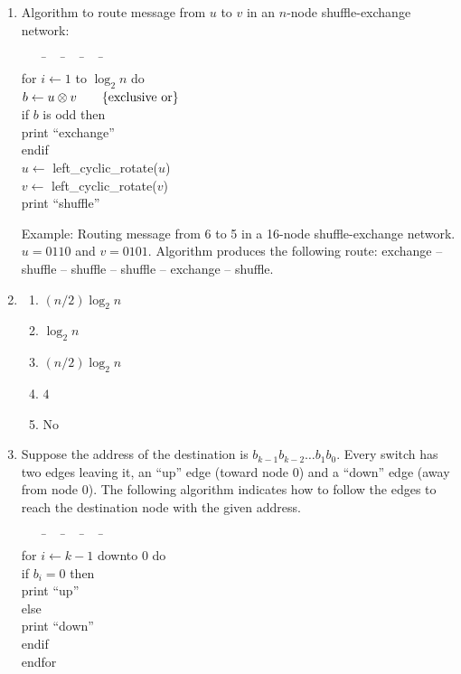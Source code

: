 \begin{enumerate}
       In all other cases, $u$ and $v$ have at least one bit in common,
       and following no more than $k-1$ shuffle links and $k-1$ exchange
       links is sufficient to reach $v$ from $u$.

\item Algorithm to route message from $u$ to $v$ in an $n$-node
      shuffle-exchange network: 

      \begin{tabbing}
      \ \ \ \=\ \ \ \=\ \ \ \=\ \ \ \=\ \ \ \=\\
      for $i \leftarrow 1$ to $\log_2 n$ do\\
      \> $b \leftarrow u \otimes v\quad\quad \{{\rm exclusive\ or}\}$\\
      \> if $b$ is odd then\\
      \>\> print ``exchange''\\
      \> endif\\
      \> $u \leftarrow$ left\_cyclic\_rotate($u$)\\
      \> $v \leftarrow$ left\_cyclic\_rotate($v$)\\
      \> print ``shuffle''
      \end{tabbing}

      Example: Routing message from 6 to 5 in a 16-node shuffle-exchange
      network. $u = 0110$ and $v = 0101$. Algorithm produces the following
      route: exchange -- shuffle -- shuffle -- shuffle -- exchange -- shuffle.

\item \begin{enumerate}
      \item $(n/2)\log_2 n$
      \item $\log_2 n$
      \item $(n/2)\log_2 n$
      \item $4$
      \item No
      \end{enumerate}

\item Suppose the address of the destination is
      $b_{k-1}b_{k-2}\ldots b_1b_0$.
      Every switch has two edges leaving it, an ``up'' edge (toward node 0)
      and a ``down'' edge (away from node 0).
      The following algorithm indicates how to follow the edges to
      reach the destination node with the given address.

      \begin{tabbing}
      \ \ \ \=\ \ \ \=\ \ \ \=\ \ \ \=\ \ \ \=\\
      for $i \leftarrow k-1$ downto $0$ do\\
      \> if $b_i = 0$ then\\
      \>\> print ``up''\\
      \> else\\
      \>\> print ``down''\\
      \> endif\\
      endfor\\
      \end{tabbing}


\end{enumerate}
